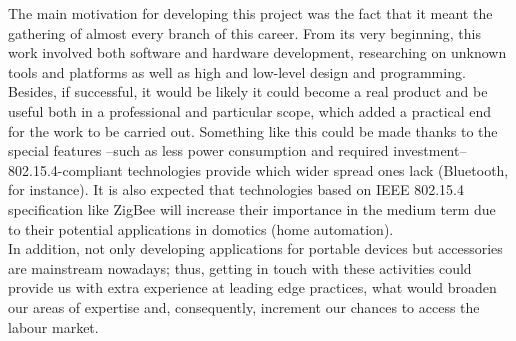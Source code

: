 		\begin{comment}
		The motivation for the realization of this project comes from two different areas.

		From a professional\todo{Professional sounds wrong} point of view, 

		CardioVascular Diseases (CVD) as high risk, expanded cause of death (citamos a la OMS)
		WBSN as a cheap, efficient method of monitoring, particularly ECG monitoring for CVD preventing.
		Smartphones as ubiquous monitoring window.
		EPFL's shimmer + iPhone bluetooth monitoring system.
		Bluetooth battery requirements don't suffice for expected device usage time.
		802.15.4 as a more efficient alternative.
		Smartphones not equipped with 802.15.4 -> Development of a receiver device.
		Android as more open, flexible, expanded platform than iOS.
		.·. Android + 802.15.4 (through a receiver device) + shimmer for continous ECG monitoring.
		\end{comment}

		The main motivation for developing this project was the fact that it meant
		the gathering of almost every branch of this career. From its very beginning, this
		work involved both software and hardware development, researching on unknown 
		tools and platforms as well as high and low-level design and programming.\\

		Besides, if successful, it would be likely it could become a real product
		and be useful both in a professional and particular scope, which added a practical
		end for the work to be carried out. Something like this could be made thanks to
		the special features --such as less power consumption and required investment-- 802.15.4-compliant
		technologies provide which wider spread ones lack (Bluetooth, for instance). It is also
		expected that technologies based on IEEE 802.15.4 specification like ZigBee will increase their
		importance in the medium term due to their potential applications in domotics (home automation).\\

		In addition, not only developing applications for portable devices but accessories
		are mainstream nowadays; thus, getting in touch with these activities could
		provide us with extra experience at leading edge practices, what would broaden our areas of
		expertise and, consequently, increment our chances to access the labour market.\\

